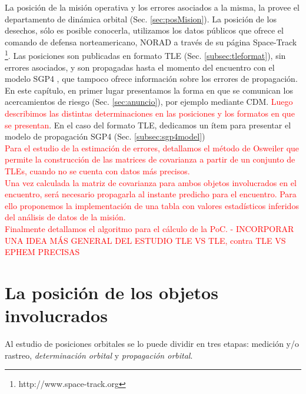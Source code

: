 La posici\'on de la misi\'on operativa y los errores asociados a la misma, la provee el departamento de din\'amica orbital (Sec. \ref{sec:posMision}).
La posici\'on de los desechos, s\'olo es posible conocerla, utilizamos los datos p\'ublicos que ofrece el comando de defensa norteamericano, \ac{NORAD} a trav\'es de su p\'agina Space-Track {\footnote{http://www.space-track.org}}. Las posiciones son publicadas en formato \ac{TLE} (Sec. \ref{subsec:tleformat}), sin errores asociados, y son propagadas hasta el momento del encuentro con el modelo SGP4  \citep{hoots1980models}, que tampoco ofrece informaci\'on sobre los errores de propagaci\'on.\\

En este cap\'itulo, en primer lugar presentamos la forma en que se comunican los acercamientos de riesgo (Sec. \ref{sec:anuncio}), por ejemplo mediante \ac{CDM}. \textcolor{red}{Luego describimos las distintas determinaciones en las posiciones y los formatos en que se presentan}. En el caso del formato TLE, dedicamos un \'item para presentar el modelo de propagaci\'on SGP4 (Sec. \ref{subsec:sgp4model})\\
\textcolor{red}{Para el estudio de la estimaci\'on de errores, detallamos el m\'etodo de Osweiler \citep{Osweiler} que permite la construcci\'on de las matrices de covarianza a partir de un conjunto de TLEs, cuando no se cuenta con datos m\'as precisos.\\
Una vez calculada la matriz de covarianza para ambos objetos involucrados en el encuentro, ser\'a necesario propagarla al instante predicho para el encuentro. Para ello proponemos la implementaci\'on de una tabla con valores estad\'isticos inferidos del an\'alisis de datos de la misi\'on.\\
Finalmente detallamos el algoritmo para el c\'alculo de la PoC. - INCORPORAR UNA IDEA M\'AS GENERAL DEL ESTUDIO TLE VS TLE, contra TLE VS EPHEM PRECISAS}\\


\section{La posici\'on de los objetos involucrados}{\label{sec:posMision}}
Al estudio de posiciones orbitales se lo puede dividir en tres etapas: medici\'on y/o rastreo, {\it{determinaci\'on orbital}} y {\it{propagaci\'on orbital}}.


